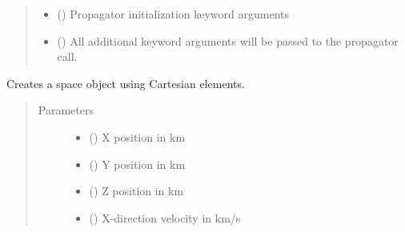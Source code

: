 \documentclass[letterpaper,10pt,english]{sphinxmanual}
\begin{document}
\begin{fulllineitems}
\begin{quote}
\begin{description}
\begin{itemize}
\item {} 
 () \textendash{} Propagator initialization keyword arguments

\item {} 
 () \textendash{} All additional keyword arguments will be passed to the propagator call.

\end{itemize}

\end{description}\end{quote}

\begin{fulllineitems}
\label{\detokenize{modules/space_object:space_object.SpaceObject.cartesian}}
Creates a space object using Cartesian elements.
\begin{quote}\begin{description}
\item[{Parameters}] \leavevmode\begin{itemize}
\item {} 
 () \textendash{} X position in km

\item {} 
 () \textendash{} Y position in km

\item {} 
 () \textendash{} Z position in km

\item {} 
 () \textendash{} X-direction velocity in km/s


\end{itemize}
\end{description}
\end{quote}
\end{fulllineitems}
\end{fulllineitems}
\end{document}
